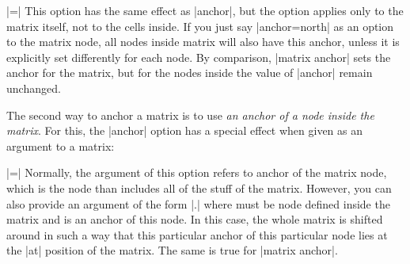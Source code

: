\begin{itemize}
  |=|
  This option has the same effect as |anchor|, but the option applies
  only to the matrix itself, not to the cells inside. If you just say
  |anchor=north| as an option to the matrix node, all nodes inside
  matrix will also have this anchor, unless it is explicitly set
  differently for each node. By comparison, |matrix anchor| sets the
  anchor for the matrix, but for the nodes inside the value of
  |anchor| remain unchanged.

\begin{codeexample}[]
\end{codeexample}
\end{itemize}

The second way to anchor a matrix is to use \emph{an anchor of a node
  inside the matrix}. For this, the |anchor| option has a special
effect when given as an argument to a matrix:

\begin{itemize}
  |=|
  Normally, the argument of this option refers to anchor of the matrix
  node, which is the node than includes all of the stuff of the
  matrix. However, you can also provide an argument of the form
  |.| where  must be node defined
  inside the matrix and  is an anchor of this node. In
  this case, the whole matrix is shifted around in such a way that
  this particular anchor of this particular node lies at the |at|
  position of the matrix. The same is true for |matrix anchor|.
\end{itemize}

\begin{codeexample}[]
\end{codeexample}



